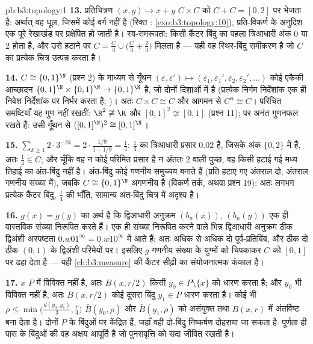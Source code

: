 \begin{solution}{pb:b3:topology:1}
\textbf{13.} प्रतिचित्रण $(x, y) \mapsto x + y$ $C \times C$ को $C + C = [0,2]$ पर भेजता है: अर्थात्
वह धूल, जिसमें कोई वर्ग नहीं है (रिक्त : \cref{exo:b3:topology:10}), प्रति-विकर्ण
के अनुदिश एक पूरे रेखाखंड पर प्रक्षेपित हो जाती है। स्व-समरूपता:
किसी कैंटर बिंदु का पहला त्रिआधारी अंक $0$ या $2$ होता है, और
उसे हटाने पर $C = \frac C3 \cup \bigl(\frac C3 +
\frac23\bigr)$ मिलता है --- यही वह स्थिर-बिंदु समीकरण है जो
$C$ का प्रत्येक चित्र उत्पन्न करता है।

\textbf{14.} $C \cong \{0,1\}^\N$ (प्रश्न 2) के माध्यम से गूँथन $(\varepsilon, \varepsilon') \mapsto
(\varepsilon_1, \varepsilon_1', \varepsilon_2,
\varepsilon_2', \dots)$ कोई एकैकी
आच्छादन $\{0,1\}^\N\times\{0,1\}^\N \to \{0,1\}^\N$ है, जो दोनों दिशाओं में  है (प्रत्येक निर्गम
निर्देशांक एक ही निवेश निर्देशांक पर निर्भर करता है; )।
अतः $C\times C \cong C$ और आगमन से $C^n \cong C$। परिचित समष्टियाँ यह गुण नहीं रखतीं:
$\R^2 \not\cong \R$ और $[0,1]^2 \not\cong [0,1]$ (प्रश्न 11); पर अनंत गुणनफल रखते हैं: उसी गूँथन से
$([0,1]^\N)^2 \cong
[0,1]^\N$।

\textbf{15.} $\sum_{k\geq1}2\cdot3^{-2k} = 2\cdot\frac{1/9}{1
- 1/9} = \frac14$: $\frac14$ का त्रिआधारी प्रसार $0.\overline{02}$ है, जिसके अंक
$\{0,2\}$ में हैं, अतः $\frac14 \in
C$; और चूँकि वह न कोई परिमित प्रसार है न अंततः
$2$ वाली पुच्छ, वह किसी हटाई गई मध्य तिहाई का अंत-बिंदु नहीं है।
अंत-बिंदु कोई गणनीय समुच्चय बनाते हैं (प्रति हटाए गए अंतराल दो,
अंतराल गणनीय संख्या में), जबकि $C \cong \{0,1\}^\N$ अगणनीय है (विकर्ण तर्क, अथवा
प्रश्न 19): अतः लगभग प्रत्येक कैंटर बिंदु, $\frac14$ की भाँति, सामान्य
अंत-बिंदु चित्र में अदृश्य है।

\textbf{16.} $g(x) = g(y)$ का अर्थ है कि द्विआधारी अनुक्रम $(b_n(x))$, $(b_n(y))$ एक
ही वास्तविक संख्या निरूपित करते हैं। एक ही संख्या निरूपित करने वाले
भिन्न द्विआधारी अनुक्रम ठीक द्विअंशी अस्पष्टता $0.w01^\infty = 0.w10^\infty$ में आते हैं:
अतः अधिक से अधिक दो पूर्व-प्रतिबिंब, और ठीक दो ठीक $(0,1)$ के द्विअंशी
परिमेयों पर। इसलिए $g$ गणनीय संख्या के युग्मों को चिपकाकर $C$
को $[0,1]$ पर ढहा देता है --- यही \cref{ch:b3:measure} की कैंटर सीढ़ी का संयोजनात्मक
कंकाल है।

\textbf{17.} $x$ $P$ में विविक्त नहीं है, अतः $B(x, r/2)$ किसी $y_0 \in P \setminus \{x\}$
को धारण करता है; और $y_0$ भी विविक्त नहीं है, अतः $B(x, r/2)$ कोई दूसरा
बिंदु $y_1
\in P$ धारण करता है। कोई भी $\rho \leq \min\bigl(\frac{d(y_0,y_1)}3,
\frac r4\bigr)$ $\bar B(y_0, \rho)$ और $\bar B(y_1,
\rho)$ को असंयुक्त
तथा $B(x, r)$ में अंतर्विष्ट बना देता है। दोनों $P$ के बिंदुओं पर
केंद्रित हैं, जहाँ वही दो-बिंदु निष्कर्षण दोहराया जा सकता है: पूर्णता
ही पास के बिंदुओं की वह अक्षय आपूर्ति है जो पुनरावृत्ति को सदा जीवित
रखती है।


\end{solution}
